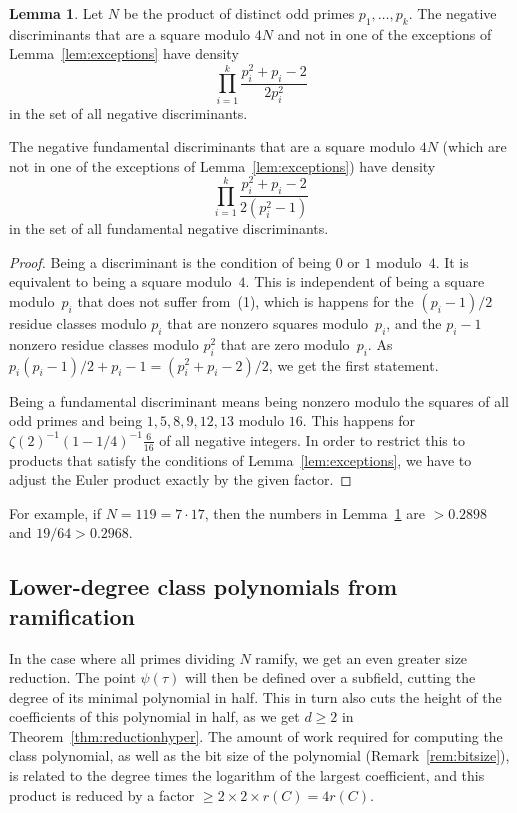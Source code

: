 \documentclass{amsart}
\numberwithin{equation}{section}
\theoremstyle{definition}
\newtheorem{lemma}[equation]{Lemma}
\begin{document}
\begin{lemma}\label{lem:proportions}
	Let $N$ be the product of distinct odd primes
	$p_1,\ldots, p_k$.
	The negative discriminants that are a square modulo $4N$
	and not in one of the exceptions of Lemma~\ref{lem:exceptions}
	have density 
	$$\prod_{i=1}^k \frac{p_i^2 + p_i-2}{2p_i^2}
	$$
	in the set of all negative discriminants.
	
	The negative fundamental discriminants that are a square modulo $4N$
	(which are not in one of the exceptions of Lemma~\ref{lem:exceptions})
	have density 
	$$\prod_{i=1}^k \frac{p_i^2 + p_i-2}{2(p_i^2-1)}$$
	in the set of all fundamental negative discriminants.
\end{lemma}
\begin{proof}
	Being a discriminant is the condition of being $0$ or $1$ modulo~$4$.
	It is equivalent to being a square modulo~$4$.
	This is independent
	of being a square modulo~$p_i$ that does not suffer from~(1),
	which is happens for the $(p_i-1)/2$ residue classes modulo $p_i$
	that are nonzero squares modulo~$p_i$,
	and the $p_i-1$ nonzero residue classes modulo $p_i^2$ that are zero modulo~$p_i$.
	As $p_i(p_i-1)/2 + p_i-1 = (p_i^2+p_i-2)/2$, we get the first statement.
	
	Being a fundamental discriminant means being nonzero
	modulo the squares of all odd primes and being $1, 5, 8, 9, 12, 13$
	modulo $16$.
	This happens for $\zeta(2)^{-1} (1-1/4)^{-1} \frac{6}{16}$ of all negative integers.
	In order to restrict this to products that satisfy the conditions
	of Lemma~\ref{lem:exceptions}, we have to adjust
	the Euler product exactly by the given factor.
\end{proof}
For example, if $N = 119 = 7\cdot 17$, then the numbers in
Lemma~\ref{lem:proportions} are $> 0.2898$
and $19/64 > 0.2968$.

\subsection{Lower-degree class polynomials from ramification}
\label{ssec:x0nplusramified}

In the case where all primes dividing $N$ ramify, we get an even
greater size reduction. The point $\psi(\tau)$
will then be defined over a subfield, cutting the degree of its
minimal polynomial in half. This in turn also cuts the height
of the coefficients of this polynomial in half,
as we get $d\geq 2$ in Theorem~\ref{thm:reductionhyper}.
The amount of work required for computing the class polynomial,
as well as the bit size of the polynomial (Remark~\ref{rem:bitsize}), is related to
the degree times the logarithm of the largest coefficient,
and this product is reduced by a factor $\geq 2\times 2 \times r(C)= 4r(C)$.
\end{document}

